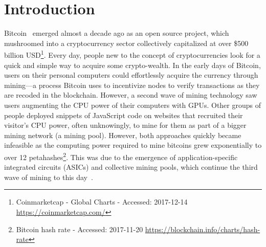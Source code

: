 

\section{Introduction}

Bitcoin~\cite{nakamoto2008bitcoin} emerged almost a decade ago as an open source project, which mushroomed into a cryptocurrency sector collectively capitalized at over \$500 billion USD\footnote{Coinmarketcap - Global Charts - Accessed: 2017-12-14 \url{https://coinmarketcap.com/}}. Every day, people new to the concept of cryptocurrencies look for a quick and simple way to acquire some crypto-wealth. In the early days of Bitcoin, users on their personal computers could effortlessly acquire the currency through mining---a process Bitcoin uses to incentivize nodes to verify transactions as they are recoded in the blockchain. However, a second wave of mining technology saw users augmenting the CPU power of their computers with GPUs. Other groups of people deployed snippets of JavaScript code on websites that recruited their visitor's CPU power, often unknowingly, to mine for them as part of a bigger mining network (\ie a mining pool). However, both approaches quickly became infeasible as the computing power required to mine bitcoins grew exponentially to over 12 petahashes\footnote{Bitcoin hash rate - Accessed: 2017-11-20 \url{https://blockchain.info/charts/hash-rate}}. This was due to the emergence of application-specific integrated circuits (ASICs) and collective mining pools, which continue the third wave of mining to this day~\cite{narayanan2016}. 

